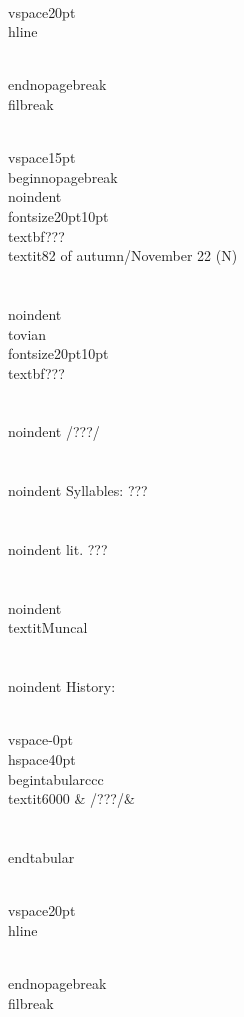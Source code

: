 \\vspace{20pt}\\hline

\\end{nopagebreak}
\\filbreak



\\vspace{15pt}
\\begin{nopagebreak}
\\noindent{\\fontsize{20pt}{10pt}\\textbf{???} } \\textit{82 of autumn/November 22} (N)\\\\
\\noindent {\\tovian \\fontsize{20pt}{10pt} \\textbf{???} }\\\\
\\noindent /???/\\\\
\\noindent Syllables: ???\\\\
\\noindent lit. ???\\\\
\\noindent \\textit{Muncal}\\\\


\\noindent History:

\\vspace{-0pt}
\\hspace{40pt}
\\begin{tabular}{ccc}
\\textit{6000} & /???/& \\\\
\\end{tabular}

\\vspace{20pt}\\hline

\\end{nopagebreak}
\\filbreak



